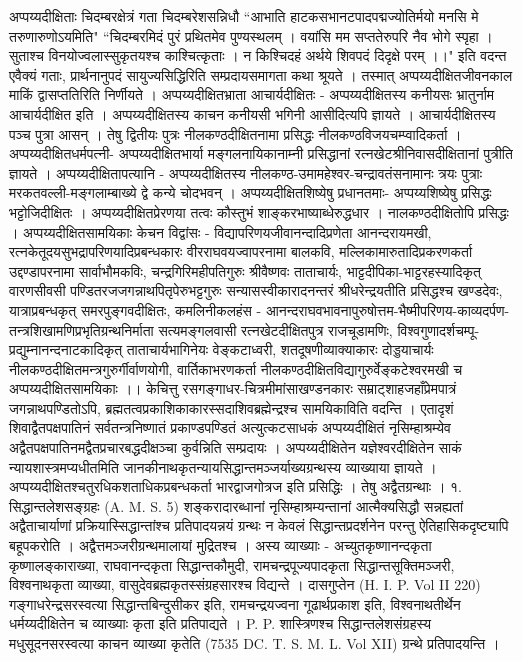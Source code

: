 अप्पय्यदीक्षिताः चिदम्बरक्षेत्रं गता चिदम्बरेशसन्निधौ ``आभाति हाटकसभानटपादपद्मज्योतिर्मयो मनसि मे तरुणारुणोऽयमिति" 
``चिदम्बरमिदं पुरं प्रथितमेव पुण्यस्थलम् ।
वयांसि मम सप्ततेरुपरि नैव भोगे स्पृहा ।
सुताश्च विनयोज्वलास्सुकृतयश्च काश्चित्कृताः ।
न किश्चिदहं अर्थये शिवपदं दिदृक्षे परम् ।।"
इति वदन्त एवैक्यं गताः, प्रार्थनानुपदं सायुज्यसिद्धिरिति सम्प्रदायसमागता कथा श्रूयते । तस्मात् अप्पय्यदीक्षितजीवनकाल माकिं द्वासप्ततिरिति निर्णीयते ।
अप्पय्यदीक्षितभ्राता आचार्यदीक्षितः -
अप्पय्यदीक्षितस्य कनीयसः भ्रातुर्नाम आचार्यदीक्षित इति । अप्पय्यदीक्षितस्य काचन कनीयसी भगिनी आसीदित्यपि ज्ञायते । आचार्यदीक्षितस्य पञ्च पुत्रा आसन् । तेषु द्वितीयः पुत्रः नीलकण्ठदीक्षितनामा प्रसिद्धः नीलकण्ठविजयचम्प्वादिकर्ता । 
अप्पय्यदीक्षितधर्मपत्नी-
अप्पय्यदीक्षितभार्या मङ्गलनायिकानाम्नी प्रसिद्धानां रत्नखेटश्रीनिवासदीक्षितानां पुत्रीति ज्ञायते ।
अप्पय्यदीक्षितापत्यानि -
अप्पय्यदीक्षितस्य नीलकण्ठ-उमामहेश्वर-चन्द्रावतंसनामानः त्रयः पुत्राः मरकतवल्ली-मङ्गलाम्बाख्ये द्वे कन्ये चोदभवन् ।
अप्पय्यदीक्षितशिष्येषु प्रधानतमाः-
अप्पय्यशिष्येषु प्रसिद्धः भट्टोजिदीक्षितः । अप्पय्यदीक्षितप्रेरणया तत्वः कौस्तुभं शाङ्करभाष्याब्धेरुद्धधार । नालकण्ठदीक्षितोपि प्रसिद्धः ।
अप्पय्यदीक्षितसामयिकाः केचन विद्वांसः -
विद्यापरिणयजीवानन्दादिप्रणेता आनन्दरायमखी, रत्नकेतूदयसुभद्रापरिणयादिप्रबन्धकारः वीरराघवयज्वापरनामा बालकवि, मल्लिकामारुतादिप्रकरणकर्ता उद्दण्डापरनामा सार्वाभौमकविः, चन्द्रगिरिमहीपतिगुरुः श्रीवैष्णवः ताताचार्यः, भाट्टदीपिका-भाट्टरहस्यादिकृत् वारणसीवसी पण्डितरजजगन्नाथपितृपेरुभट्टगुरुः सन्यासस्वीकारादनन्तरं श्रीधरेन्द्रयतीति प्रसिद्धश्च खण्डदेवः, यात्राप्रबन्धकृत् समरपुङ्गवदीक्षितः, कमलिनीकलहंस - आनन्दराघवभावनापुरुषोत्तम-भैष्मीपरिणय-काव्यदर्पण-तन्त्रशिखामणिप्रभृतिग्रन्थनिर्माता सत्यमङ्गलवासी रत्नखेटदीक्षितपुत्र राजचूडामणिः, विश्वगुणादर्शचम्पू-प्रद्युम्नानन्दनाटकादिकृत् ताताचार्यभागिनेयः वेङ्कटाध्वरी, शतदूषणीव्याक्याकारः दोड्डयाचार्यः नीलकण्ठदीक्षितमन्त्रगुरुर्गीर्वाणयोगी, वार्तिकाभरणकर्ता नीलकण्ठदीक्षितविद्यागुरुर्वेङ्कटेश्वरमखी च अप्पय्यदीक्षितसामयिकाः ।।
केचित्तु रसगङ्गाधर-चित्रमीमांसाखण्डनकारः सम्राट्शाहजहाँप्रेमपात्रं जगन्नाथपण्डितोऽपि, ब्रह्मतत्वप्रकाशिकाकारस्सदाशिवब्रह्मेन्द्रश्च सामयिकाविति वदन्ति ।
एतादृशं शिवाद्वैतपक्षपातिनं सर्वतन्त्रनिष्णातं प्रकाण्डपण्डितं अत्युत्कटसाधकं अप्पय्यदीक्षितं नृसिम्हाश्रम्येव अद्वैतपक्षपातिनमद्वैतप्रचारबद्धदीक्षञ्चा कुर्वन्निति सम्प्रदायः । अप्पय्यदीक्षितेन यज्ञेश्वरदीक्षितेन साकं न्यायशास्त्रमप्यधीतमिति जानकीनाथकृतन्यायसिद्धान्तमञ्जर्याख्यग्रन्थस्य व्याख्याया ज्ञायते । अप्पय्यदीक्षितश्चतुरधिकशताधिकप्रबन्धकर्ता भारद्वाजगोत्रज इति प्रसिद्धिः । तेषु अद्वैतग्रन्थाः ।
१. सिद्धान्तलेशसङ्ग्रहः (A. M. S. 5)
शङ्करादारब्धानां नृसिम्हाश्रम्यन्तानां आत्मैक्यसिद्धौ सन्नह्यतां अद्वैताचार्याणां प्रक्रियास्सिद्धान्तांश्च प्रतिपादयन्नयं ग्रन्थः न केवलं सिद्धान्तप्रदर्शनेन परन्तु ऐतिहासिकदृष्ट्यापि बहूपकरोति । अद्वैत्तमञ्जरीग्रन्थमालायां मुद्रितश्च । अस्य व्याख्याः - अच्युतकृष्णानन्दकृता कृष्णालङ्काराख्या, राघवानन्दकृता सिद्धान्तकौमुदी, रामचन्द्रपूज्यपादकृता सिद्धान्तसूक्तिमञ्जरी, विश्वनाथकृता व्याख्या, वासुदेवब्रह्मकृतस्संग्रहसारश्च विद्यन्ते । दासगुप्तेन (H. I. P. Vol II 220) गङ्गाधरेन्द्रसरस्वत्या सिद्धान्तबिन्दुसीकर इति, रामचन्द्रयज्वना गूढार्थप्रकाश इति, विश्वनाथतीर्थेन धर्मय्यदीक्षितेन च व्याख्याः कृता इति प्रतिपाद्यते । P. P. शास्त्रिणश्च सिद्धान्तलेशसंग्रहस्य मधुसूदनसरस्वत्या काचन व्याख्या कृतेति (7535 DC. T. S. M. L. Vol XII) ग्रन्थे प्रतिपादयन्ति ।
